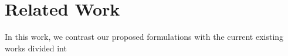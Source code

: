 \documentclass[letterpaper, 10 pt, conference]{IEEEtran}  %
\begin{document}
% 
% 
%




\section{Related Work}
In this work, we contrast our proposed formulations with the current existing works divided int
\end{document}
